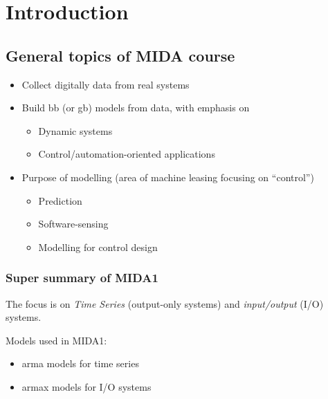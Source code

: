 \setcounter{chapter}{-1}
\chapter{Introduction}

\section{General topics of MIDA course}

\begin{itemize}
    \item Collect digitally data from real systems
    \item Build \acrfull{bb} (or \gls{gb}) models from data, with emphasis on
    \begin{itemize}
        \item Dynamic systems
        \item Control/automation-oriented applications
    \end{itemize}
    \item Purpose of modelling (area of machine leasing focusing on ``control'')
    \begin{itemize}
        \item Prediction
        \item Software-sensing
        \item Modelling for control design
    \end{itemize}
\end{itemize}

\subsection{Super summary of MIDA1}
The focus is on \emph{Time Series} (output-only systems) and \emph{input/output} (I/O) systems.

Models used in MIDA1:
\begin{itemize}
    \item \gls{arma} models for time series
    \item \gls{armax} models for I/O systems
\end{itemize}

